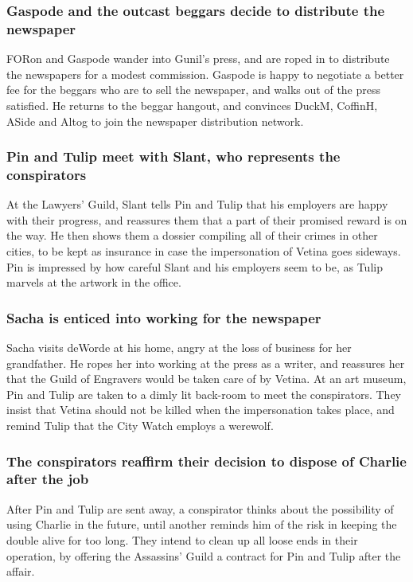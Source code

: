 \subsubsection{\Gls{Gaspode} and the outcast beggars decide to distribute the newspaper}
\Gls{FORon} and \Gls{Gaspode} wander into \Gls{Gunil}'s press, and are roped in to distribute the
newspapers for a modest commission. \Gls{Gaspode} is happy to negotiate a better fee for the
beggars who are to sell the newspaper, and walks out of the press satisfied. He returns to the
beggar hangout, and convinces \Gls{DuckM}, \Gls{CoffinH}, \Gls{ASide} and \Gls{Altog} to join the
newspaper distribution network.

\subsubsection{\Gls{Pin} and \Gls{Tulip} meet with \Gls{Slant}, who represents the conspirators}
At the Lawyers' Guild, \Gls{Slant} tells \Gls{Pin} and \Gls{Tulip} that his employers are happy
with their progress, and reassures them that a part of their promised reward is on the way. He
then shows them a dossier compiling all of their crimes in other cities, to be kept as insurance
in case the impersonation of \Gls{Vetina} goes sideways. \Gls{Pin} is impressed by how careful
\Gls{Slant} and his employers seem to be, as \Gls{Tulip} marvels at the artwork in the office.

\subsubsection{\Gls{Sacha} is enticed into working for the newspaper}
\Gls{Sacha} visits \Gls{deWorde} at his home, angry at the loss of business for her grandfather. He
ropes her into working at the press as a writer, and reassures her that the Guild of Engravers would
be taken care of by \Gls{Vetina}. At an art museum, \Gls{Pin} and \Gls{Tulip} are taken to a
dimly lit back-room to meet the conspirators. They insist that \Gls{Vetina} should not be killed
when the impersonation takes place, and remind \Gls{Tulip} that the City Watch employs a werewolf.

\subsubsection{The conspirators reaffirm their decision to dispose of \Gls{Charlie} after the job}
After \Gls{Pin} and \Gls{Tulip} are sent away, a conspirator thinks about the possibility of
using \Gls{Charlie} in the future, until another reminds him of the risk in keeping the double
alive for too long. They intend to clean up all loose ends in their operation, by offering the
Assassins' Guild a contract for \Gls{Pin} and \Gls{Tulip} after the affair.

